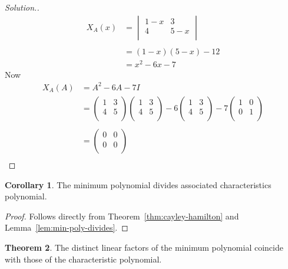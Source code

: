 \documentclass[11pt,a4paper]{article}
\theoremstyle{definition}
\newtheorem{thm}{Theorem}[subsection]
\newtheorem{coro}[thm]{Corollary}
\newenvironment{solution}
  {\renewcommand{\qedsymbol}{}\begin{proof}[\textit{Solution}.]}
  {\end{proof}}
\begin{document}
\begin{solution}
\begin{align*}
X_A(x) &=
\begin{vmatrix}
1-x&3\\4&5-x\\
\end{vmatrix}\\\\
&=(1-x)(5-x)-12\\
&=x^2-6x-7
\end{align*}
Now
\begin{align*}
X_A(A) &=A^2-6A-7I\\
&=
\begin{pmatrix}
1&3\\4&5\\
\end{pmatrix}
\begin{pmatrix}
1&3\\4&5\\
\end{pmatrix}
-6
\begin{pmatrix}
1&3\\4&5\\
\end{pmatrix}
-7
\begin{pmatrix}
1&0\\0&1\\
\end{pmatrix}\\\\
&=
\begin{pmatrix}
0&0\\0&0\\
\end{pmatrix}\\
\end{align*}
\end{solution}


\begin{coro}
The minimum polynomial divides associated characteristics polynomial.
\end{coro}


\begin{proof}
Follows directly from Theorem~\ref{thm:cayley-hamilton} and Lemma~\ref{lem:min-poly-divides}.
\end{proof}


\begin{thm}\label{thm:min-char-factors}
The distinct linear factors of the minimum polynomial coincide with those of
the characteristic polynomial.
\end{thm}
\end{document}
